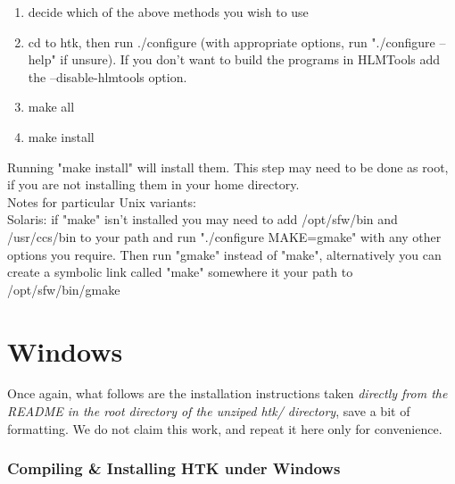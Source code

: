 \documentclass{wileySev}
\begin{document}
\begin{enumerate}
	\item decide which of the above methods you wish to use
	\item cd to htk, then run ./configure (with appropriate options, run "./configure --help" if unsure).
   If you don't want to build the programs in HLMTools add the
   --disable-hlmtools option.
	\item make all
	\item make install
\end{enumerate}

Running "make install" will install them.  This step may need to be
done as root, if you are not installing them in your home directory.\\

Notes for particular Unix variants:\\
Solaris: if "make" isn't installed you may need to add /opt/sfw/bin
and /usr/ccs/bin to your path and run "./configure MAKE=gmake" with
any other options you require.  Then run "gmake" instead of "make",
alternatively you can create a symbolic link called "make" somewhere
it your path to /opt/sfw/bin/gmake

\section{Windows}
Once again, what follows are the installation instructions taken \textit{directly from the README in the root directory of the unziped htk/ directory}, save a bit of formatting. We do not claim this work, and repeat it here only for convenience.\\
\subsubsection{Compiling \& Installing HTK under Windows}~\\
\end{document}
